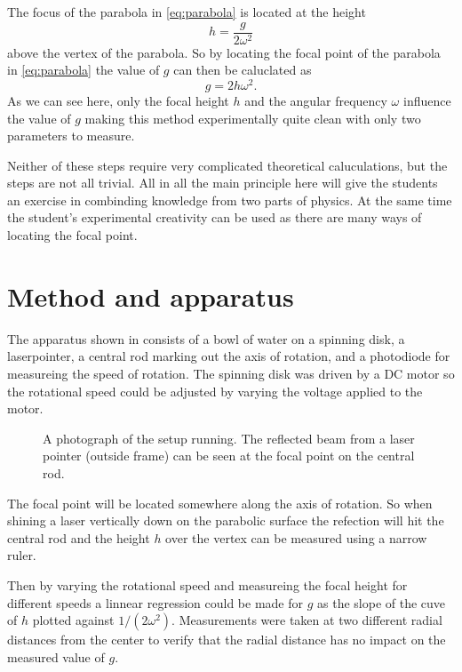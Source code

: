 \documentclass[11pt,towcolumn, swedish, english]{article}
\begin{document}
The focus of the parabola in \eqref{eq:parabola} is located at the
height~\cite{Physics_Handbook} 
\begin{equation}
h=\frac{g}{2\omega^2}
\end{equation}
above the vertex of the parabola. So by locating the focal point of
the parabola in \eqref{eq:parabola} the value of $g$ can then be
caluclated as 
\begin{equation}
g=2h\omega^2.
\end{equation}
As we can see here, only the focal height $h$ and the angular
frequency $\omega$ influence the value of $g$ making this method
experimentally quite clean with only two parameters to measure. 

Neither of these steps require very complicated theoretical caluculations, but
the steps are not all trivial. All in all the main principle here will
give the students an exercise in combinding knowledge from two parts
of physics. At the same time the student's experimental creativity can
be used as there are many ways of locating the focal point. 




\section{Method and apparatus}
The apparatus shown in  consists of a bowl of water
on a spinning disk, a laserpointer, a central rod marking out the axis of
rotation, and a photodiode for measureing the speed of rotation. The spinning
disk was driven by a DC motor so the rotational speed could be
adjusted by varying the voltage applied to the motor. 

\begin{figure}
\centering
\resizebox{0.7\linewidth}{!}{}
\caption{A photograph of the setup running. The
  reflected beam from a laser pointer (outside frame) can be seen at
  the focal point on the central rod. } 
\label{fig:rot_bowl_pic} 
\end{figure}

The focal point will be located somewhere along the axis of rotation. So when
shining a laser vertically down on the parabolic surface the refection will hit
the central rod and the height $h$ over the vertex can be measured
using a narrow ruler. 

Then by varying the rotational speed and measureing the focal height for
different speeds a linnear regression could be made for $g$ as the
slope of the cuve of $h$ plotted against $1/(2\omega^2)$. 
Measurements were taken at two different radial distances from the
center to verify that the radial distance has no impact on the measured
value of $g$. 
\end{document}
